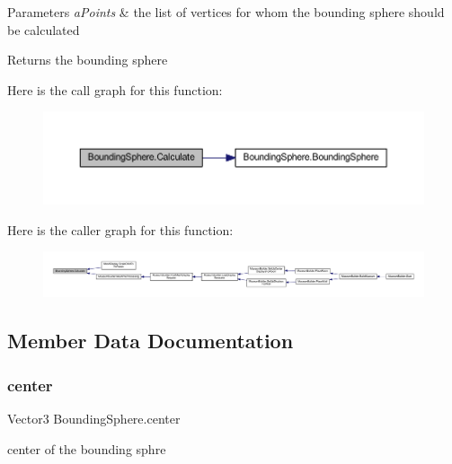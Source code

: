 \begin{DoxyParams}{Parameters}
{\em a\+Points} & the list of vertices for whom the bounding sphere should be calculated\\
\hline
\end{DoxyParams}
\begin{DoxyReturn}{Returns}
the bounding sphere
\end{DoxyReturn}
Here is the call graph for this function\+:
\nopagebreak
\begin{figure}[H]
\begin{center}
\leavevmode
\includegraphics[width=350pt]{class_bounding_sphere_a29c277d13a701089666b94fabf3c87d6_cgraph}
\end{center}
\end{figure}
Here is the caller graph for this function\+:
\nopagebreak
\begin{figure}[H]
\begin{center}
\leavevmode
\includegraphics[width=350pt]{class_bounding_sphere_a29c277d13a701089666b94fabf3c87d6_icgraph}
\end{center}
\end{figure}


\subsection{Member Data Documentation}
\mbox{\label{class_bounding_sphere_a0996d0f450c5e7fcca8446ebbd8ddc20}} 
\subsubsection{\texorpdfstring{center}{center}}
{\footnotesize\ttfamily Vector3 Bounding\+Sphere.\+center}



center of the bounding sphre 

